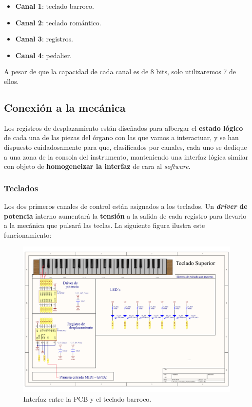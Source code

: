 \begin{itemize}
	\item \textbf{Canal 1}: teclado barroco.
	\item \textbf{Canal 2}: teclado romántico.
	\item \textbf{Canal 3}: registros.
	\item \textbf{Canal 4}: pedalier.
\end{itemize}

A pesar de que la capacidad de cada canal es de 8 bits, solo utilizaremos 7 de ellos.

\subsection{Conexión a la mecánica}
\label{subsec:conexion_mecanica}

Los registros de desplazamiento están diseñados para albergar el \textbf{estado lógico} de cada una de las piezas del órgano con las que vamos a interactuar, y se han dispuesto cuidadosamente para que, clasificados por canales, cada uno se dedique a una zona de la consola del instrumento, manteniendo una interfaz lógica similar con objeto de \textbf{homogeneizar la interfaz} de cara al \textit{software}.

\subsubsection{Teclados}

Los dos primeros canales de control están asignados a los teclados. Un \textbf{\textit{driver} de potencia} interno aumentará la \textbf{tensión} a la salida de cada registro para llevarlo a la mecánica que pulsará las teclas. La siguiente figura ilustra este funcionamiento:

\smallskip

\begin{figure}[H]
	\noindent \begin{centering}
		\includegraphics[width=\linewidth*2/3]{capitulo3/pcb_teclado}
		\par\end{centering}
	\smallskip
	\caption{\label{fig:pcb_teclado} Interfaz entre la \acrshort{PCB} y el teclado barroco.}
\end{figure} 

